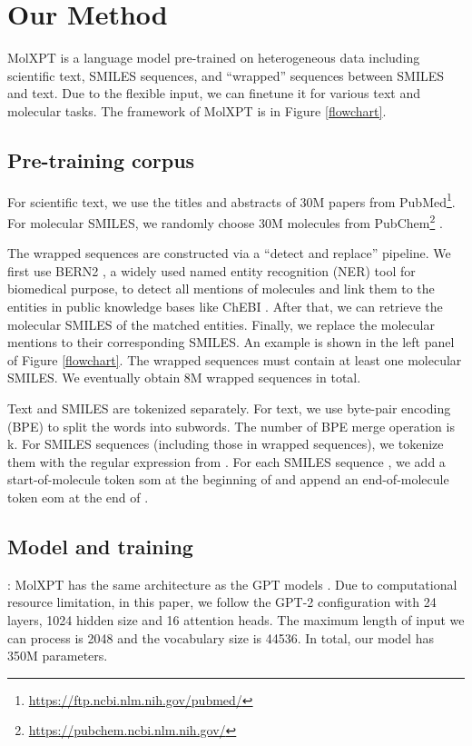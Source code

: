 \documentclass[11pt]{article}
\newcommand{\ourM}{MolXPT}
\newcommand{\som}{som}
\newcommand{\eom}{eom}
\begin{document}
\section{Our Method}

\ourM{} is a language model  pre-trained on heterogeneous data including scientific text, SMILES sequences, and ``wrapped'' sequences between SMILES and text. Due to the flexible input, we can finetune it for various text and molecular tasks. The framework of \ourM{} is in Figure \ref{flowchart}.
\subsection{Pre-training corpus}
For scientific text, we use the titles and abstracts of 30M papers from PubMed\footnote{\url{https://ftp.ncbi.nlm.nih.gov/pubmed/}}. For molecular SMILES, we randomly choose 30M molecules from PubChem\footnote{\url{https://pubchem.ncbi.nlm.nih.gov/}} \citep{pubchem}.


The wrapped sequences are constructed via a ``detect and replace'' pipeline. We first use BERN2 \cite{bern2}, a widely used named entity recognition (NER) tool for biomedical purpose, to detect all mentions of molecules and link them to the entities in public knowledge bases like ChEBI \cite{chebi}. After that, we can retrieve the molecular SMILES of the matched entities. Finally, we replace the molecular mentions to their corresponding SMILES. An example is shown in the left panel of Figure \ref{flowchart}.
The wrapped sequences must contain at least one molecular SMILES. We eventually obtain 8M wrapped sequences in total.


Text and SMILES  are tokenized separately. For  text, we use byte-pair encoding (BPE) \citep{sennrich2016BPE} to split the words into subwords. The number of BPE merge operation is k.  For SMILES sequences (including those in wrapped sequences), we tokenize them  with the regular expression from \citep{schwaller2018found}. For each SMILES sequence , we add a start-of-molecule token \som{} at the beginning of  and append an end-of-molecule token \eom{} at the end of .



\subsection{Model and training}
: \ourM{} has the same architecture as the GPT models \citep{gpt2}. Due to computational resource limitation, in this paper, we follow the GPT-2 configuration  with 24 layers, 1024 hidden size and 16 attention heads. The maximum length of input we can process is 2048 and the vocabulary size is 44536. In total, our model has 350M parameters.
\end{document}
